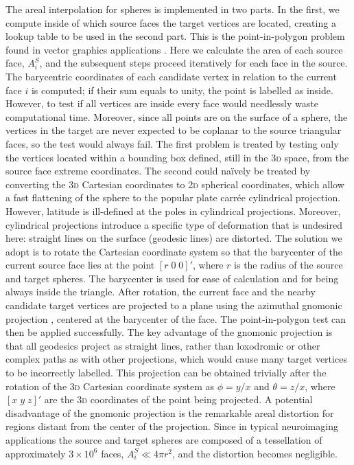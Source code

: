 The areal interpolation for spheres is implemented in two parts. In the first, we compute inside of which source faces the target vertices are located, creating a lookup table to be used in the second part. This is the point-in-polygon problem found in vector graphics applications \citep{Vince2005}. Here we calculate the area of each source face, $A^{S}_{i}$, and the subsequent steps proceed iteratively for each face in the source. The barycentric coordinates of each candidate vertex in relation to the current face $i$ is computed; if their sum equals to unity, the point is labelled as inside. However, to test if all vertices are inside every face would needlessly waste computational time. Moreover, since all points are on the surface of a sphere, the vertices in the target are never expected to be coplanar to the source triangular faces, so the test would always fail. The first problem is treated by testing only the vertices located within a bounding box defined, still in the \textsc{3d} space, from the source face extreme coordinates. The second could na\"{i}vely be treated by converting the \textsc{3d} Cartesian coordinates to \textsc{2d} spherical coordinates, which allow a fast flattening of the sphere to the popular plate carr\'{e}e cylindrical projection. However, latitude is ill-defined at the poles in cylindrical projections. Moreover, cylindrical projections introduce a specific type of deformation that is undesired here: straight lines on the surface (geodesic lines) are distorted. The solution we adopt is to rotate the Cartesian coordinate system so that the barycenter of the current source face lies at the point $[r\;0\;0]'$, where $r$ is the radius of the source and target spheres. The barycenter is used for ease of calculation and for being always inside the triangle. After rotation, the current face and the nearby candidate target vertices are projected to a plane using the azimuthal gnomonic projection \citep{Snyder1987}, centered at the barycenter of the face. The point-in-polygon test can then be applied successfully. The key advantage of the gnomonic projection is that all geodesics project as straight lines, rather than loxodromic or other complex paths as with other projections, which would cause many target vertices to be incorrectly labelled. This projection can be obtained trivially after the rotation of the \textsc{3d} Cartesian coordinate system as $\phi=y/x$ and $\theta=z/x$, where $[x\;y\;z]'$ are the \textsc{3d} coordinates of the point being projected. A potential disadvantage of the gnomonic projection is the remarkable areal distortion for regions distant from the center of the projection. Since in typical neuroimaging applications the source and target spheres are composed of a tessellation of approximately $3\times10^6$ faces, $A^{S}_{i} \ll 4 \pi r^2$, and the distortion becomes negligible.

